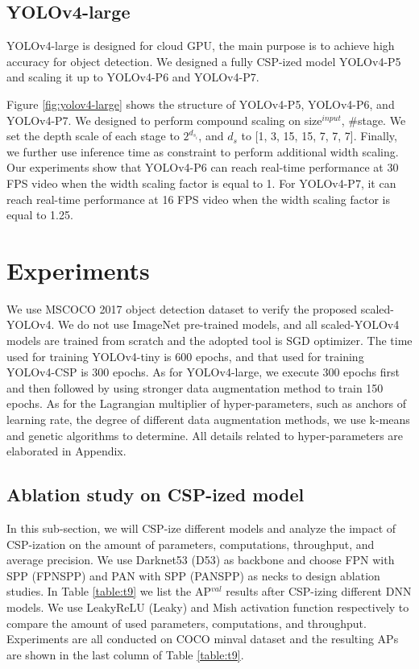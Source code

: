 \documentclass[10pt,twocolumn,letterpaper]{article}
\begin{document}
\subsection{YOLOv4-large}

YOLOv4-large is designed for cloud GPU, the main purpose is to achieve high accuracy for object detection. We designed a fully CSP-ized model YOLOv4-P5 and scaling it up to YOLOv4-P6 and YOLOv4-P7.

Figure \ref{fig:yolov4-large} shows the structure of YOLOv4-P5, YOLOv4-P6, and YOLOv4-P7.  We designed to perform compound scaling on {size$^{input}$, \#stage}.  We set the depth scale of each stage to ${2}^{{d}_{{s}_{i}}}$, and ${d}_{s}$ to [1, 3, 15, 15, 7, 7, 7].  Finally, we further use inference time as constraint to perform additional width scaling.  Our experiments show that YOLOv4-P6 can reach real-time performance at 30 FPS video when the width scaling factor is equal to 1.  For YOLOv4-P7, it can reach real-time performance at 16 FPS video when the width scaling factor is equal to 1.25.

\section{Experiments}

We use MSCOCO 2017 object detection dataset to verify the proposed scaled-YOLOv4.  We do not use ImageNet pre-trained models, and all scaled-YOLOv4 models are trained from scratch and the adopted tool is SGD optimizer.  The time used for training YOLOv4-tiny is 600 epochs, and that used for training YOLOv4-CSP is 300 epochs.  As for YOLOv4-large, we execute 300 epochs first and then followed by using stronger data augmentation method to train 150 epochs.  As for the Lagrangian multiplier of hyper-parameters, such as anchors of learning rate, the degree of different data augmentation methods, we use k-means and genetic algorithms to determine.  All details related to hyper-parameters are elaborated in Appendix.

\subsection{Ablation study on CSP-ized model}

In this sub-section, we will CSP-ize different models and analyze the impact of CSP-ization on the amount of parameters, computations, throughput, and average precision.  We use Darknet53 (D53) as backbone and choose FPN with SPP (FPNSPP) and PAN with SPP (PANSPP) as necks to design ablation studies.  In Table \ref{table:t9} we list the AP$^{val}$ results after CSP-izing different DNN models.  We use LeakyReLU (Leaky) and Mish activation function respectively to compare the amount of used parameters, computations, and throughput.  Experiments are all conducted on COCO minval dataset and the resulting APs are shown in the last column of Table \ref{table:t9}.
\end{document}
